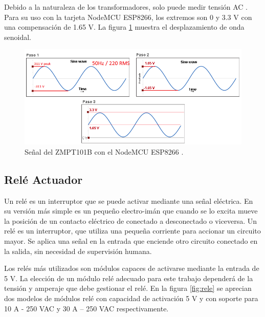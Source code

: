 Debido a la naturaleza de los transformadores, solo puede medir tensión AC \citep{WEBSITE:22} \citep{ARTICLE:1}. Para su uso con la tarjeta NodeMCU ESP8266, los extremos son 0 y 3.3 V con una compensación de 1.65 V. La figura \ref{fig:ondas} muestra el desplazamiento de onda senoidal.


\begin{figure}[htpb]
\centering 
\includegraphics[width=1.02\textwidth]{./Figures/ondas.png}
\caption{Señal del ZMPT101B con el NodeMCU ESP8266 \protect\footnotemark.}
\label{fig:ondas}
\end{figure}





\subsection{Relé Actuador}

Un relé es un interruptor que se puede activar mediante una señal eléctrica. En su versión más simple es un pequeño electro-imán que cuando se lo excita mueve la posición de un contacto eléctrico de conectado a desconectado o viceversa. Un relé es un interruptor, que utiliza una pequeña corriente para accionar un circuito mayor. Se aplica una señal en la entrada que enciende otro circuito conectado en la salida, sin necesidad de supervisión humana.

Los relés más utilizados son módulos capaces de activarse mediante la entrada de 5 V. La elección de un módulo relé adecuado para este trabajo dependerá de la tensión y amperaje que debe gestionar el relé. En la figura \ref{fig:rele} se aprecian dos modelos de módulos relé con capacidad de activación 5 V y con soporte para 10 A - 250 VAC y 30 A – 250 VAC respectivamente.


